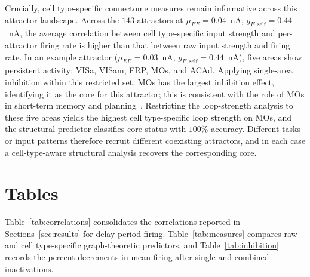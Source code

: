 \documentclass[11pt]{article}
\begin{document}
Crucially, cell type-specific connectome measures remain informative across this attractor landscape. Across the $143$ attractors at $\mu_{EE}=0.04$~nA, $g_{E,\text{self}}=0.44$~nA, the average correlation between cell type-specific input strength and per-attractor firing rate is higher than that between raw input strength and firing rate. In an example attractor ($\mu_{EE}=0.03$~nA, $g_{E,\text{self}}=0.44$~nA), five areas show persistent activity: VISa, VISam, FRP, MOs, and ACAd. Applying single-area inhibition within this restricted set, MOs has the largest inhibition effect, identifying it as the core for this attractor; this is consistent with the role of MOs in short-term memory and planning~\cite{inagaki2019discrete,gilad2018behavioral}. Restricting the loop-strength analysis to these five areas yields the highest cell type-specific loop strength on MOs, and the structural predictor classifies core status with $100\%$ accuracy. Different tasks or input patterns therefore recruit different coexisting attractors, and in each case a cell-type-aware structural analysis recovers the corresponding core.

\section{Tables}

Table~\ref{tab:correlations} consolidates the correlations reported in Sections~\ref{sec:results} for delay-period firing. Table~\ref{tab:measures} compares raw and cell type-specific graph-theoretic predictors, and Table~\ref{tab:inhibition} records the percent decrements in mean firing after single and combined inactivations.
\end{document}

